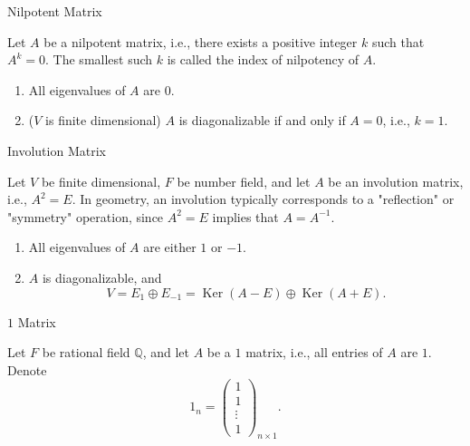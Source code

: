 \documentclass[11pt]{../../TexTemplate/elegantbook} %
\begin{document}
\begin{leftbarTitle}{Nilpotent Matrix}\end{leftbarTitle}
Let \(A\) be a nilpotent matrix, i.e., there exists a positive integer \(k\) such that \(A^k = 0\).
The smallest such \(k\) is called the index of nilpotency of \(A\).

\begin{enumerate}
    \item All eigenvalues of \(A\) are \(0\).
    \item (\(V\) is finite dimensional) \(A\) is diagonalizable if and only if \(A = 0\), i.e., \(k=1\).
\end{enumerate}


\begin{leftbarTitle}{Involution Matrix}\end{leftbarTitle}
Let \(V\) be finite dimensional, \(F\) be number field, and let \(A\) be an involution matrix, i.e., \(A^2 = E\).
In geometry, an involution typically corresponds to a "reflection" or "symmetry" operation,
since \(A^{2}=E\) implies that \(A=A^{-1}\).

\begin{enumerate}
    \item All eigenvalues of \(A\) are either \(1\) or \(-1\).
    \item \(A\) is diagonalizable, and
        \[
        V = E_{1} \oplus E_{-1} = \operatorname{Ker}(A-E) \oplus \operatorname{Ker}(A+E).
        \]
\end{enumerate}

\begin{leftbarTitle}{\(1\) Matrix}\end{leftbarTitle}
Let \(F\) be rational field \( \mathbb{Q} \), and let \(A\) be a \(1\) matrix, i.e., all entries of \(A\) are \(1\).
Denote
\[
1_{n} = \begin{pmatrix}
    1 \\
    1 \\
    \vdots\\
    1 
\end{pmatrix}_{n \times 1}.
\]
\end{document}

